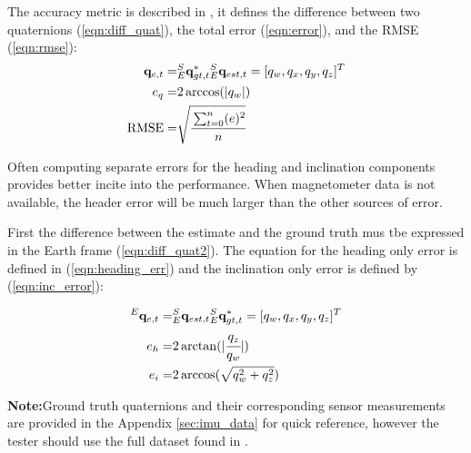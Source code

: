 \documentclass[12pt, titlepage]{article}
\begin{document}
The accuracy metric is described in \cite{broad}, it defines the difference between two quaternions
(\ref{eqn:diff_quat}), the total error (\ref{eqn:error}), and the RMSE (\ref{eqn:rmse}):
\begin{align}
    \mathbf{q}_{e, t} =& {}^S_E\mathbf{q}^{*}_{gt, t}  {}^S_E\mathbf{q}_{est, t} = [q_w, q_x, q_y, q_z]^T \label{eqn:diff_quat} \\
    e_q =& 2 \arccos(|q_w|)  \label{eqn:error}\\
    \text{RMSE} =& \sqrt{\cfrac{\sum_{t=0}^n(e)^2}{n}}  \label{eqn:rmse}
\end{align}

Often computing separate errors for the heading and inclination components provides better incite into the performance. When magnetometer data is not available, the header error will be much larger than the other sources of error.

First the difference between the estimate and the ground truth mus tbe expressed in the Earth frame (\ref{eqn:diff_quat2}). The equation for the heading only error is defined in (\ref{eqn:heading_err}) and the inclination only error is defined by (\ref{eqn:inc_error}):

\begin{align}
    {}^E \mathbf{q}_{e,t} =& {}^S_E\mathbf{q}_{est, t} {}^S_E\mathbf{q}^{*}_{gt, t} = [q_w, q_x, q_y, q_z]^T \label{eqn:diff_quat2} \\ 
    e_{h} =& 2 \arctan(|\cfrac{q_z}{q_w}|) \label{eqn:heading_err} \\
    e_{i} =&  2 \arccos(\sqrt{q_w^2 + q_z^2}) \label{eqn:inc_error}
\end{align}

\textbf{Note:}Ground truth quaternions and their corresponding sensor measurements are provided in the Appendix \ref{sec:imu_data} for quick reference, however the tester should use the full dataset found in \citep{broad_code}.
\end{document}
